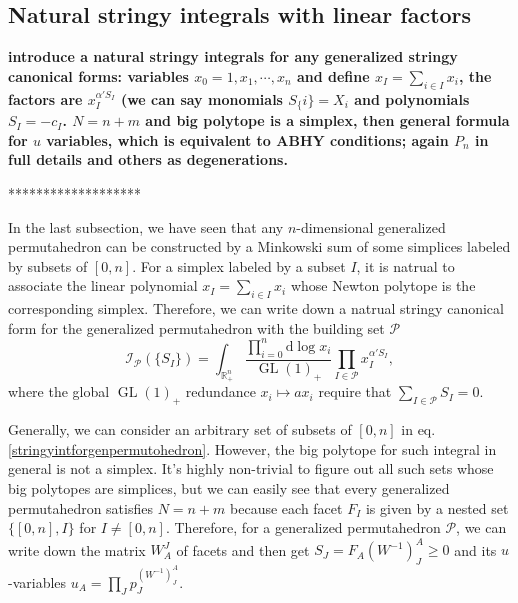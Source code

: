 \documentclass[hidelinks,12pt]{article}
\begin{document}
\subsection{Natural stringy integrals with linear factors} 

{\bf introduce a natural stringy integrals for any generalized stringy canonical forms: variables $x_0=1, x_1, \cdots, x_n$ and define $x_I=\sum_{i \in I} x_i$, the factors are $x_I^{\alpha' S_I}$ (we can say monomials $S_\{i\}=X_i$ and polynomials $S_I=-c_I$. $N=n+m$ and big polytope is a simplex, then general formula for $u$ variables, which is equivalent to ABHY conditions; again $P_n$ in full details and others as degenerations.}

*******************

In the last subsection, we have seen that any $n$-dimensional generalized 
permutahedron can be constructed by a Minkowski sum of some simplices labeled by
subsets of $[0,n]$. For a simplex labeled by a subset $I$, 
it is natrual to associate the linear polynomial $x_I=\sum_{i\in I}x_i$ whose Newton polytope is the corresponding simplex. Therefore, we can write down a natrual stringy canonical form for the generalized permutahedron with the building set 
$\mathscr P$
\begin{equation} \label{stringyintforgenpermutohedron}
   \mathcal I_{\mathscr P}(\{S_I\})=\int_{\mathbb R^{n}_+}
	\frac{\prod_{i=0}^n \mathrm{d}\log x_i}
	{\operatorname{GL}(1)_+}\prod_{I\in\mathscr P}x_I^{\alpha' S_I},
\end{equation}
where the global $\operatorname{GL}(1)_+$ redundance $x_i\mapsto a x_i$ require that 
$\sum_{I\in\mathscr P}S_I = 0$. 

Generally, we can consider an arbitrary set of subsets of $[0,n]$ in eq.\eqref{stringyintforgenpermutohedron}. 
However, the big polytope for such integral in general is not a simplex.
It's highly non-trivial to figure out all such sets whose big polytopes are simplices,
but we can easily see that every generalized permutahedron satisfies $N=n+m$
because each facet $F_I$ is given by a nested set $\{[0,n],I\}$ for $I\neq [0,n]$.
Therefore, for a generalized permutahedron $\mathscr P$, we can write down the matrix 
$W^J_A$ of facets and then get $S_J=F_A(W^{-1})^A_J\geq 0$ and 
its $u$-variables $u_A=\prod_J p_J^{(W^{-1})^A_J}$.
\end{document}
